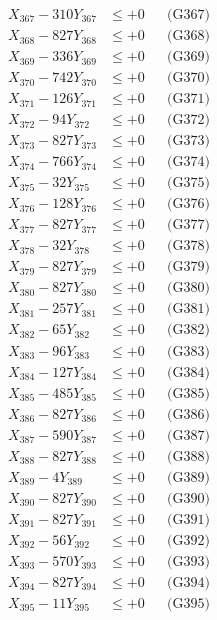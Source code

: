 \documentclass[a4paper,10pt]{article}
\begin{document}
{\begin{align}
X_{367} - 310Y_{367} &\leq +0 && \text{(G367)} \\
X_{368} - 827Y_{368} &\leq +0 && \text{(G368)} \\
X_{369} - 336Y_{369} &\leq +0 && \text{(G369)} \\
X_{370} - 742Y_{370} &\leq +0 && \text{(G370)} \\
\allowbreak
X_{371} - 126Y_{371} &\leq +0 && \text{(G371)} \\
X_{372} - 94Y_{372} &\leq +0 && \text{(G372)} \\
X_{373} - 827Y_{373} &\leq +0 && \text{(G373)} \\
X_{374} - 766Y_{374} &\leq +0 && \text{(G374)} \\
X_{375} - 32Y_{375} &\leq +0 && \text{(G375)} \\
X_{376} - 128Y_{376} &\leq +0 && \text{(G376)} \\
X_{377} - 827Y_{377} &\leq +0 && \text{(G377)} \\
X_{378} - 32Y_{378} &\leq +0 && \text{(G378)} \\
X_{379} - 827Y_{379} &\leq +0 && \text{(G379)} \\
X_{380} - 827Y_{380} &\leq +0 && \text{(G380)} \\
\allowbreak
X_{381} - 257Y_{381} &\leq +0 && \text{(G381)} \\
X_{382} - 65Y_{382} &\leq +0 && \text{(G382)} \\
X_{383} - 96Y_{383} &\leq +0 && \text{(G383)} \\
X_{384} - 127Y_{384} &\leq +0 && \text{(G384)} \\
X_{385} - 485Y_{385} &\leq +0 && \text{(G385)} \\
X_{386} - 827Y_{386} &\leq +0 && \text{(G386)} \\
X_{387} - 590Y_{387} &\leq +0 && \text{(G387)} \\
X_{388} - 827Y_{388} &\leq +0 && \text{(G388)} \\
X_{389} - 4Y_{389} &\leq +0 && \text{(G389)} \\
X_{390} - 827Y_{390} &\leq +0 && \text{(G390)} \\
\allowbreak
X_{391} - 827Y_{391} &\leq +0 && \text{(G391)} \\
X_{392} - 56Y_{392} &\leq +0 && \text{(G392)} \\
X_{393} - 570Y_{393} &\leq +0 && \text{(G393)} \\
X_{394} - 827Y_{394} &\leq +0 && \text{(G394)} \\
X_{395} - 11Y_{395} &\leq +0 && \text{(G395)} \\

\end{align}}
\end{document}
